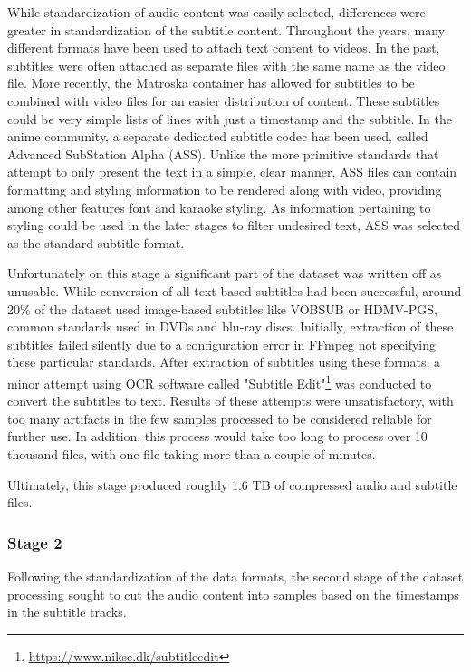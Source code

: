 While standardization of audio content was easily selected, differences were greater in standardization of the subtitle content.
Throughout the years, many different formats have been used to attach text content to videos.
In the past, subtitles were often attached as separate files with the same name as the video file.
More recently, the Matroska container has allowed for subtitles to be combined with video files for an easier distribution of content.
These subtitles could be very simple lists of lines with just a timestamp and the subtitle.
In the anime community, a separate dedicated subtitle codec has been used, called Advanced SubStation Alpha\cite{wiki:advancedsub} (ASS).
Unlike the more primitive standards that attempt to only present the text in a simple, clear manner, ASS files can contain formatting and styling information to be rendered along with video, providing among other features font and karaoke styling.
As information pertaining to styling could be used in the later stages to filter undesired text, ASS was selected as the standard subtitle format.

Unfortunately on this stage a significant part of the dataset was written off as unusable.
While conversion of all text-based subtitles had been successful, around 20\% of the dataset used image-based subtitles like VOBSUB or HDMV-PGS, common standards used in DVDs and blu-ray discs.
Initially, extraction of these subtitles failed silently due to a configuration error in FFmpeg not specifying these particular standards.
After extraction of subtitles using these formats, a minor attempt using OCR software called "Subtitle Edit"\footnote{\url{https://www.nikse.dk/subtitleedit}} was conducted to convert the subtitles to text.
Results of these attempts were unsatisfactory, with too many artifacts in the few samples processed to be considered reliable for further use.
In addition, this process would take too long to process over 10 thousand files, with one file taking more than a couple of minutes.

Ultimately, this stage produced roughly 1.6 TB of compressed audio and subtitle files.

\subsubsection{Stage 2}
Following the standardization of the data formats, the second stage of the dataset processing sought to cut the audio content into samples based on the timestamps in the subtitle tracks.

